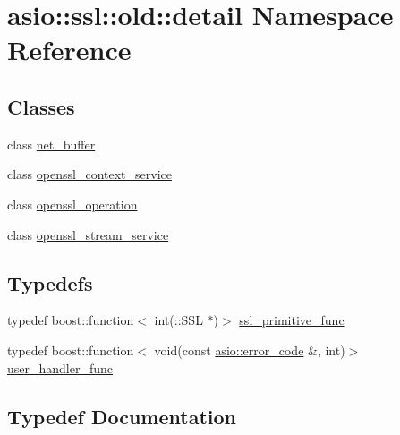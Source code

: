 \hypertarget{namespaceasio_1_1ssl_1_1old_1_1detail}{}\section{asio\+:\+:ssl\+:\+:old\+:\+:detail Namespace Reference}
\label{namespaceasio_1_1ssl_1_1old_1_1detail}
\subsection*{Classes}
\begin{DoxyCompactItemize}
\item 
class \hyperlink{classasio_1_1ssl_1_1old_1_1detail_1_1net__buffer}{net\+\_\+buffer}
\item 
class \hyperlink{classasio_1_1ssl_1_1old_1_1detail_1_1openssl__context__service}{openssl\+\_\+context\+\_\+service}
\item 
class \hyperlink{classasio_1_1ssl_1_1old_1_1detail_1_1openssl__operation}{openssl\+\_\+operation}
\item 
class \hyperlink{classasio_1_1ssl_1_1old_1_1detail_1_1openssl__stream__service}{openssl\+\_\+stream\+\_\+service}
\end{DoxyCompactItemize}
\subsection*{Typedefs}
\begin{DoxyCompactItemize}
\item 
typedef boost\+::function$<$ int(\+::S\+S\+L $\ast$)$>$ \hyperlink{namespaceasio_1_1ssl_1_1old_1_1detail_ac338e0197f7b92011daad86db7d838ba}{ssl\+\_\+primitive\+\_\+func}
\item 
typedef boost\+::function$<$ void(const \hyperlink{classasio_1_1error__code}{asio\+::error\+\_\+code} \&, int)$>$ \hyperlink{namespaceasio_1_1ssl_1_1old_1_1detail_adb21335c4883c670ec54bece575120eb}{user\+\_\+handler\+\_\+func}
\end{DoxyCompactItemize}


\subsection{Typedef Documentation}
\hypertarget{namespaceasio_1_1ssl_1_1old_1_1detail_ac338e0197f7b92011daad86db7d838ba}{}
